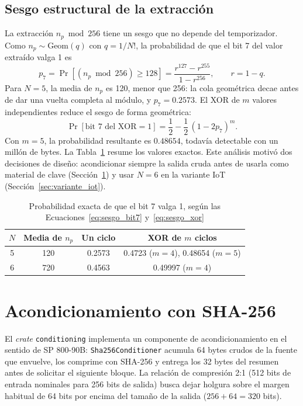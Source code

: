 \subsection{Sesgo estructural de la extracción}
\label{sec:sesgo}

La extracción $n_p \bmod 256$ tiene un sesgo que no depende del temporizador. Como $n_p \sim \text{Geom}(q)$ con $q = 1/N!$, la probabilidad de que el bit 7 del valor extraído valga 1 es
\begin{equation}
    p_7 = \Pr\left[(n_p \bmod 256) \geq 128\right] = \frac{r^{127} - r^{255}}{1 - r^{256}}, \qquad r = 1 - q.
    \label{eq:sesgo_bit7}
\end{equation}
Para $N = 5$, la media de $n_p$ es 120, menor que 256: la cola geométrica decae antes de dar una vuelta completa al módulo, y $p_7 = 0.2573$. El XOR de $m$ valores independientes reduce el sesgo de forma geométrica:
\begin{equation}
    \Pr[\text{bit 7 del XOR} = 1] = \frac{1}{2} - \frac{1}{2}\,(1 - 2p_7)^m.
    \label{eq:sesgo_xor}
\end{equation}
Con $m = 5$, la probabilidad resultante es $0.48654$, todavía detectable con un millón de bytes. La Tabla~\ref{tab:sesgo} resume los valores exactos. Este análisis motivó dos decisiones de diseño: acondicionar siempre la salida cruda antes de usarla como material de clave (Sección~\ref{sec:acondicionamiento}) y usar $N = 6$ en la variante IoT (Sección~\ref{sec:variante_iot}).

\begin{table}[H]
\centering
\caption{Probabilidad exacta de que el bit 7 valga 1, según las Ecuaciones~\eqref{eq:sesgo_bit7} y~\eqref{eq:sesgo_xor}}
\label{tab:sesgo}
\begin{tabular}{@{}cccc@{}}
\toprule
$N$ & Media de $n_p$ & Un ciclo & XOR de $m$ ciclos \\
\midrule
5 & 120 & 0.2573 & 0.4723 ($m = 4$), 0.48654 ($m = 5$) \\
6 & 720 & 0.4563 & 0.49997 ($m = 4$) \\
\bottomrule
\end{tabular}
\end{table}

\section{Acondicionamiento con SHA-256}
\label{sec:acondicionamiento}

El \textit{crate} \texttt{conditioning} implementa un componente de acondicionamiento en el sentido de SP 800-90B: \texttt{Sha256Conditioner} acumula 64 bytes crudos de la fuente que envuelve, los comprime con SHA-256 \cite{NIST2015SecureHashStandard} y entrega los 32 bytes del resumen antes de solicitar el siguiente bloque. La relación de compresión 2:1 (512 bits de entrada nominales para 256 bits de salida) busca dejar holgura sobre el margen habitual de 64 bits por encima del tamaño de la salida ($256 + 64 = 320$ bits).

